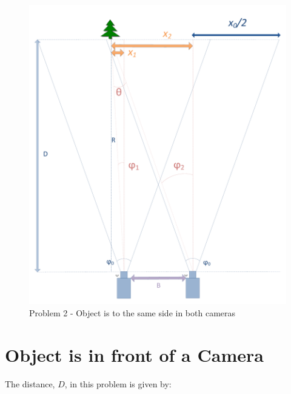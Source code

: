 \begin{figure}
\includegraphics[width=\textwidth,height=\textheight,keepaspectratio]{Figures/problem2.pdf}
\caption{Problem 2 - Object is to the same side in both cameras}
\label{problem_toleft}
\end{figure}

\section{Object is in front of a Camera}
The distance, $D$, in this problem is given by:

